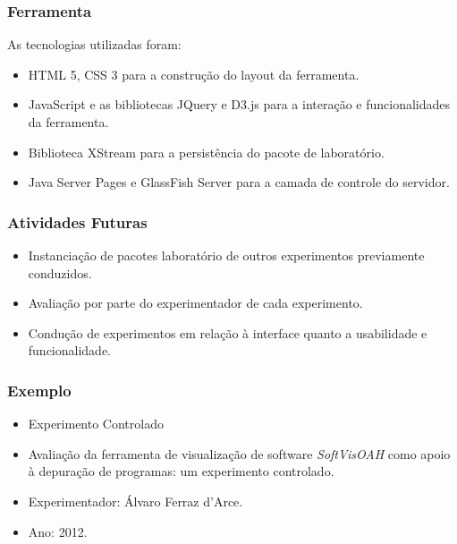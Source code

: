 \documentclass[aspectratio=169]{beamer}
\begin{document}
\begin{frame}
\frametitle{Ferramenta}
\justifying

As tecnologias utilizadas foram: 
\begin{itemize}
\item HTML 5, CSS 3 para a construção do layout da ferramenta.
\item JavaScript e as bibliotecas JQuery e D3.js para a interação e funcionalidades da ferramenta.
\item Biblioteca XStream para a persistência do pacote de laboratório.
\item Java Server Pages e GlassFish Server para a camada de controle do servidor.
\end{itemize}

\end{frame}


\begin{frame}
\frametitle{Atividades Futuras}
\justifying

\begin{itemize}
\item Instanciação de pacotes laboratório de outros experimentos previamente conduzidos. 
\item Avaliação por parte do experimentador de cada experimento.
\item Condução de experimentos em relação à interface quanto a usabilidade e funcionalidade.
\end{itemize}


\end{frame}

\begin{frame}
\frametitle{Exemplo}
\justifying

\begin{itemize}
\item Experimento Controlado
\item Avaliação da ferramenta de visualização de software \textit{SoftVisOAH} como apoio à depuração de programas: um experimento controlado.
\item Experimentador: Álvaro Ferraz d’Arce.
\item Ano: 2012.
\end{itemize}


\end{frame}



   
   


\end{document}
